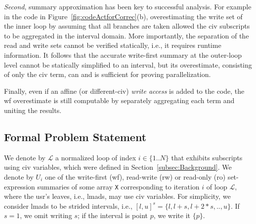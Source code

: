 \documentclass{sig-alternate}
\begin{document}
{\em Second}, summary approximation has been key to successful
analysis. For example in the code in Figure~\ref{fig:codeActforCorrec}(b), 
overestimating the write set of the inner loop by assuming that all 
branches are taken allowed the {\sc civ} subscripts to be aggregated in the 
interval domain. 
More importantly, the separation of the read and write sets cannot 
be verified statically, i.e., it requires runtime information. 
%
It follows that the accurate write-first summary at the 
outer-loop level cannot be statically simplified to an interval,
but its overestimate, consisting of only the {\sc civ} term, 
can and is sufficient for proving parallelization.

Finally, even if an affine (or different-{\sc civ})
{\em write access} is added to the code, the {\sc wf} overestimate
is still computable by separately aggregating each
term and uniting the results. %

\subsection{Formal Problem Statement}
\label{subsec:ProblemHL}

We denote by $\mathcal{L}$ a normalized loop of index $i\in\{1..N\}$ that
exhibits subscripts using {\sc civ} variables, which were defined
in Section~\ref{subsec:Background}. %
%
We denote by $U_i$ one of the write-first ({\sc wf}), read-write ({\sc rw})
or read-only ({\sc ro}) set-expression summaries of some array {\tt X} 
corresponding to iteration $i$ of loop $\mathcal{L}$, where the {\sc usr}'s 
leaves, i.e., {\sc lmad}s, may use {\sc civ} variables. 
%
For simplicity, we consider {\sc lmad}s to be 
strided intervals, i.e., $[l,u]^s=\{l, l+s, l+2*s, .., u\}$.
If $s=1$, we omit writing $s$; if the interval 
is point $p$, we write it $\{p\}$.
  
\end{document}
